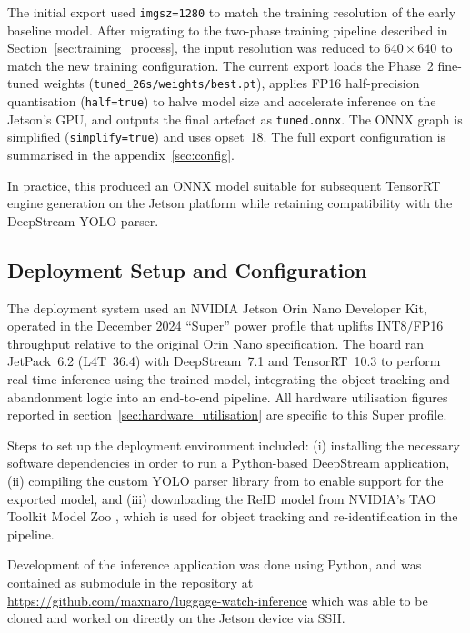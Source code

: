 The initial export used \texttt{imgsz=1280} to match the training resolution of
the early baseline model. After migrating to the two-phase training pipeline
described in Section~\ref{sec:training_process}, the input resolution was
reduced to $640 \times 640$ to match the new training configuration. The
current export loads the Phase~2 fine-tuned weights
(\texttt{tuned\_26s/weights/best.pt}), applies FP16 half-precision quantisation
(\texttt{half=true}) to halve model size and accelerate inference on the
Jetson's GPU, and outputs the final artefact as \texttt{tuned.onnx}. The ONNX
graph is simplified (\texttt{simplify=true}) and uses opset~18. The full export
configuration is summarised in the appendix~\ref{sec:config}.

In practice, this produced an ONNX model suitable for subsequent TensorRT
engine generation on the Jetson platform while retaining compatibility with the
DeepStream YOLO parser.

\subsection{Deployment Setup and Configuration}
\label{sec:deployment_setup_and_configuration}

The deployment system used an NVIDIA Jetson Orin Nano Developer Kit, operated
in the December 2024 ``Super'' power profile that uplifts INT8/FP16 throughput
relative to the original Orin Nano specification. The board ran JetPack~6.2
(L4T~36.4) with DeepStream~7.1 and TensorRT~10.3 to perform real-time inference
using the trained model, integrating the object tracking and abandonment logic
into an end-to-end pipeline. All hardware utilisation figures reported in
section~\ref{sec:hardware_utilisation} are specific to this Super profile.

Steps to set up the deployment environment included: (i) installing the
necessary software dependencies in order to run a Python-based DeepStream
application, (ii) compiling the custom YOLO parser library from
\citet{luciano2026deepstreamyolo} to enable support for the exported model, and
(iii) downloading the ReID model from NVIDIA's TAO Toolkit Model Zoo
\citep{nvidia2026reidnet}, which is used for object tracking and
re-identification in the pipeline.

Development of the inference application was done using Python, and was
contained as submodule in the repository at
\url{https://github.com/maxnaro/luggage-watch-inference} which was able to be
cloned and worked on directly on the Jetson device via SSH.

